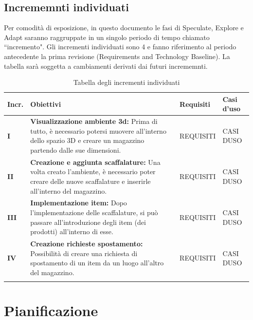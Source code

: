 \subsection{Incrememnti individuati}\label{sec:modello_sviluppo:incrementi}
Per comodità di esposizione, in questo documento le fasi di Speculate, Explore e Adapt saranno raggruppate in un singolo periodo di tempo chiamato ``incremento".
Gli incrementi individuati sono 4 e fanno riferimento al periodo antecedente la prima revisione (Requirements and Technology Baseline).
La tabella sarà soggetta a cambiamenti derivati dai futuri incrememnti.
\begin{xltabular}{\textwidth}{p{0.05\textwidth} | X | X | X}

    \textbf{\color{white} Incr.} & \textbf{\color{white} Obiettivi} & \textbf{\color{white} Requisiti} & \textbf{\color{white} Casi d'uso}\\ 
    \hline
    \endhead
    
    \textbf{I} 
    & \textbf{Visualizzazione ambiente 3d:} Prima di tutto, è necessario potersi muovere all'interno dello spazio 3D e creare un magazzino partendo dalle sue dimensioni.
    & REQUISITI
    & CASI DUSO \\
    \hline

    \textbf{II} 
    & \textbf{Creazione e aggiunta scaffalature:} Una volta creato l'ambiente, è necessario poter creare delle nuove scaffalature e inserirle all'interno del magazzino.
    & REQUISITI
    & CASI DUSO \\
    \hline

    \textbf{III} 
    & \textbf{Implementazione item:} Dopo l'implementazione delle scaffalature, si può passare all'introduzione degli item (dei prodotti) all'interno di esse.
    & REQUISITI
    & CASI DUSO \\
    \hline

    \textbf{IV} 
    & \textbf{Creazione richieste spostamento:} Possibilità di creare una richiesta di spostamento di un item da un luogo all'altro del magazzino.
    & REQUISITI
    & CASI DUSO \\
    \hline
\caption{Tabella degli incrementi individuati}\label{tab:incrementi}
\end{xltabular}

\newpage
\section{Pianificazione}\label{sec:pianificazione}

